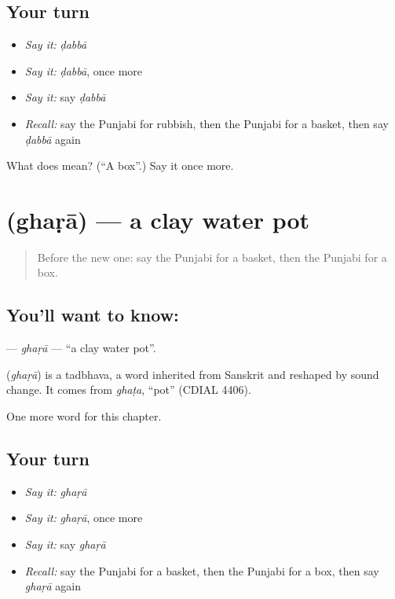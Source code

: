 \subsection*{Your turn}
\begin{itemize}
\raggedright
  \item \emph{Say it:} \emph{ḍabbā}
  \item \emph{Say it:} \emph{ḍabbā}, once more
  \item \emph{Say it:} say \emph{ḍabbā}
  \item \emph{Recall:} say the Punjabi for rubbish, then the Punjabi for a basket, then say \emph{ḍabbā} again
\end{itemize}

\begin{tcolorbox}[breakable,colback=teal!4,colframe=teal!35!black,title={Before you move on}]
What does  mean? (\textquotedblleft{}A box\textquotedblright{}.) Say it once more.
\end{tcolorbox}
\section[\texorpdfstring{\pa{ਘੜਾ} (ghaṛā)}{ਘੜਾ (ghaṛā)}]{ (ghaṛā) — a clay water pot}

\label{lesson:PA-C117-ghara}



\begin{quote}
Before the new one: say the Punjabi for a basket, then the Punjabi for a box.
\end{quote}

\subsection*{You'll want to know: }
\textbf{} — \emph{ghaṛā} — \textquotedblleft{}a clay water pot\textquotedblright{}.

\begin{cousinweb}
\textbf{} (\emph{ghaṛā}) is a tadbhava, a word inherited from Sanskrit and reshaped by sound change. It comes from \emph{ghaṭa}, \textquotedblleft{}pot\textquotedblright{} (CDIAL 4406).
\end{cousinweb}

\begin{grammarlens}[title={What you've built}]
One more word for this chapter.
\end{grammarlens}

\subsection*{Your turn}
\begin{itemize}
\raggedright
  \item \emph{Say it:} \emph{ghaṛā}
  \item \emph{Say it:} \emph{ghaṛā}, once more
  \item \emph{Say it:} say \emph{ghaṛā}
  \item \emph{Recall:} say the Punjabi for a basket, then the Punjabi for a box, then say \emph{ghaṛā} again
\end{itemize}

